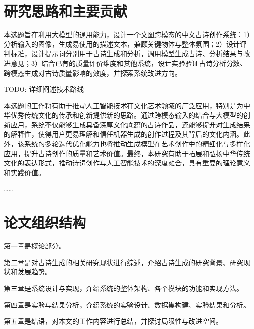 \section{研究思路和主要贡献}

本选题旨在利用大模型的通用能力，设计一个文图跨模态的中文古诗创作系统：1）分析输入的图像，生成易使用的描述文本，兼顾关键物体与整体氛围；2）设计评判标准，设计提示词分别用于古诗生成和分析，调用模型生成古诗、分析结果与改进意见；3）结合已有的质量评价维度和其他系统，设计实验验证古诗分析分数、跨模态生成对古诗质量影响的效度，并探索系统改进方向。

TODO: 详细阐述技术路线

本选题的工作将有助于推动人工智能技术在文化艺术领域的广泛应用，特别是为中华优秀传统文化的传承和创新提供新的思路。通过跨模态输入的结合与大模型的创新应用，系统不仅能够生成具备深厚文化底蕴的古诗作品，还能够提升对生成结果的解释性，使得用户更易理解和信任机器生成的创作过程及其背后的文化内涵。此外，该系统的多轮迭代优化能力也将推动生成模型在艺术创作中的精细化与多样化应用，提升古诗创作的质量和艺术价值。最终，本研究有助于拓展和弘扬中华传统文化的表达形式，推动诗词创作与人工智能技术的深度融合，具有重要的理论意义和实践价值。

……

\section{论文组织结构}

    第一章是概论部分。
    
    第二章是对古诗生成的相关研究现状进行综述，介绍古诗生成的研究背景、研究现状和发展趋势。

    第三章是系统设计与实现，介绍系统的整体架构、各个模块的功能和实现方法。

    第四章是实验与结果分析，介绍系统的实验设计、数据集构建、实验结果和分析。

    第五章是结语，对本文的工作内容进行总结，并探讨局限性与改进空间。